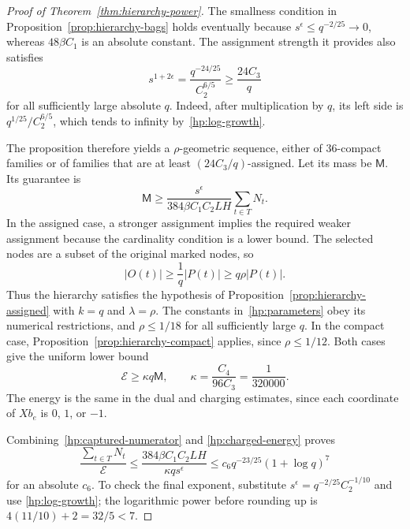 \begin{proof}[Proof of Theorem~\ref{thm:hierarchy-power}]
The smallness condition in Proposition~\ref{prop:hierarchy-bags} holds
eventually because $s^\epsilon\le q^{-2/25}\to0$, whereas
$48\beta C_1$ is an absolute constant.  The assignment strength it
provides also satisfies
\begin{equation}\label{hp:assignment-strength}
 s^{1+2\epsilon}=\frac{q^{-24/25}}{C_2^{6/5}}
 \ge\frac{24C_3}{q}
\end{equation}
for all sufficiently large absolute $q$.  Indeed, after multiplication
by $q$, its left side is $q^{1/25}/C_2^{6/5}$, which tends to infinity
by~\eqref{hp:log-growth}.

The proposition therefore yields a $\rho$-geometric sequence, either
of $36$-compact families or of families that are at least
$(24C_3/q)$-assigned.  Let its mass be $\mathsf M$.  Its guarantee is
\begin{equation}\label{hp:captured-numerator}
 \mathsf M\ge
 \frac{s^\epsilon}{384\beta C_1C_2LH}\sum_{t\in T}N_t.
\end{equation}
In the assigned case, a stronger assignment implies the required weaker
assignment because the cardinality condition is a lower bound.  The
selected nodes are a subset of the original marked nodes, so
\[
 |O(t)|\ge\frac1q|P(t)|\ge q\rho|P(t)|.
\]
Thus the hierarchy satisfies the hypothesis of
Proposition~\ref{prop:hierarchy-assigned} with $k=q$ and $\lambda=\rho$.
The constants in~\eqref{hp:parameters} obey its numerical restrictions,
and $\rho\le1/18$ for all sufficiently large $q$.  In the compact
case, Proposition~\ref{prop:hierarchy-compact} applies, since
$\rho\le1/12$.  Both cases give the uniform lower bound
\begin{equation}\label{hp:charged-energy}
 \mathcal E\ge\kappa q\mathsf M,
 \qquad \kappa=\frac{C_4}{96C_3}=\frac1{320000}.
\end{equation}
The energy is the same in the dual and charging estimates, since each
coordinate of $Xb_e$ is $0$, $1$, or $-1$.

Combining~\eqref{hp:captured-numerator} and
\eqref{hp:charged-energy} proves
\begin{equation}\label{hp:bad}
 \frac{\sum_{t\in T}N_t}{\mathcal E}
 \le\frac{384\beta C_1C_2LH}{\kappa q s^\epsilon}
 \le c_6 q^{-23/25}(1+\log q)^7
\end{equation}
for an absolute $c_6$.  To check the final exponent, substitute
$s^\epsilon=q^{-2/25}C_2^{-1/10}$ and use
\eqref{hp:log-growth}; the logarithmic power before rounding up is
$4(11/10)+2=32/5<7$.


\end{proof}
